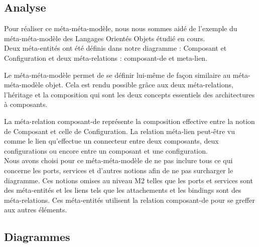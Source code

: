 \documentclass[11pt,a4paper]{article}
\begin{document}
\subsection{Analyse}
Pour réaliser ce méta-méta-modèle, nous nous sommes aidé de l'exemple du
méta-méta-modèle des Langages Orientés Objets étudié en cours.\\

Deux méta-entités ont été définis dans notre diagramme : Composant et
Configuration et deux méta-relations : composant-de et meta-lien.

Le méta-méta-modèle permet de se définir lui-même de façon similaire au
méta-méta-modèle objet. Cela est rendu possible grâce aux deux méta-relations, 
l'héritage et la composition qui sont les deux concepts essentiels des
architectures à composants.

La méta-relation composant-de représente la composition effective entre la
notion de Composant et celle de Configuration. La relation méta-lien peut-être
vu comme le lien qu'effectue un connecteur entre deux composants, deux
configurations ou encore entre un composant et une configuration.\\

Nous avons choisi pour ce méta-méta-modèle de ne pas inclure tous ce qui concerne
les ports, services et d'autres notions afin de ne pas surcharger le diagramme.
Ces notions omises au niveau M2 telles que les ports et services sont des
méta-entités et les liens tels que les attachements et les bindings sont des
méta-relations. Ces méta-entités utilisent la relation composant-de pour se
greffer aux autres éléments.

\clearpage
\subsection{Diagrammes}
\end{document}
